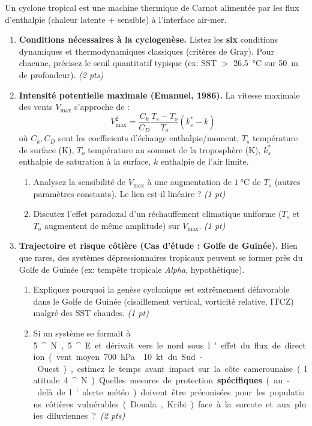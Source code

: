 \documentclass[11pt]{article}
\providecommand{\degree}{^{\circ}}
\begin{document}
\begin{exercice}
\label{exo:cyclones}
Un cyclone tropical est une machine thermique de Carnot alimentée par les flux d'enthalpie (chaleur latente + sensible) à l'interface air-mer.

\begin{enumerate}
    \item \textbf{Conditions nécessaires à la cyclogenèse.} Listez les \textbf{six} conditions dynamiques et thermodynamiques classiques (critères de Gray). Pour chacune, précisez le seuil quantitatif typique (ex: SST $>$ \SI{26.5}{\celsius} sur \SI{50}{m} de profondeur). \textit{(2 pts)}

    \item \textbf{Intensité potentielle maximale (Emanuel, 1986).} La vitesse maximale des vents $V_{\text{max}}$ s'approche de :
    $$ V_{\text{max}}^2 = \frac{C_k}{C_D} \frac{T_s - T_o}{T_o} (k^*_s - k) $$
    où $C_k, C_D$ sont les coefficients d'échange enthalpie/moment, $T_s$ température de surface (K), $T_o$ température au sommet de la troposphère (K), $k^*_s$ enthalpie de saturation à la surface, $k$ enthalpie de l'air limite.
    \begin{enumerate}
        \item Analysez la sensibilité de $V_{\text{max}}$ à une augmentation de $\SI{1}{\celsius}$ de $T_s$ (autres paramètres constants). Le lien est-il linéaire ? \textit{(1 pt)}
        \item Discutez l'effet paradoxal d'un réchauffement climatique uniforme ($T_s$ et $T_o$ augmentent de même amplitude) sur $V_{\text{max}}$. \textit{(1 pt)}
    \end{enumerate}

    \item \textbf{Trajectoire et risque côtière (Cas d'étude : Golfe de Guinée).} Bien que rares, des systèmes dépressionnaires tropicaux peuvent se former près du Golfe de Guinée (ex: tempête tropicale \textit{Alpha}, hypothétique).
    \begin{enumerate}
        \item Expliquez pourquoi la genèse cyclonique est extrêmement défavorable dans le Golfe de Guinée (cisaillement vertical, vorticité relative, ITCZ) malgré des SST chaudes. \textit{(1 pt)}
        \item Si un système se formait à \SI{5}{\degree}N, \SI{5}{\degree}E et dérivait vers le nord sous l'effet du flux de direction (vent moyen \SI{700}{hPa} \approx \SI{10}{kt} du Sud-Ouest), estimez le temps avant impact sur la côte camerounaise (latitude \SI{4}{\degree}N). Quelles mesures de protection \textbf{spécifiques} (au-delà de l'alerte météo) doivent être préconisées pour les populations côtières vulnérables (Douala, Kribi) face à la surcote et aux pluies diluviennes ? \textit{(2 pts)}
    \end{enumerate}
\end{enumerate}
\end{exercice}
\end{document}
